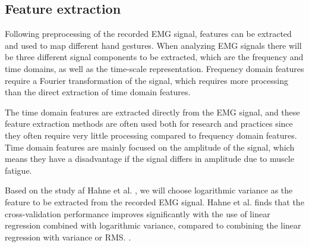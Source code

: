 \subsection{Feature extraction}



Following preprocessing of the recorded EMG signal, features can be extracted and used to map different hand gestures. When analyzing EMG signals there will be three different signal components to be extracted, which are the frequency and time domains, as well as the time-scale representation. Frequency domain features require a Fourier transformation of the signal, which requires more processing than the direct extraction of time domain features. \cite{phiny2012}

The time domain features are extracted directly from the EMG signal, and these feature extraction methods are often used both for research and practices since they often require very little processing compared to frequency domain features. Time domain features are mainly focused on the amplitude of the signal, which means they have a disadvantage if the signal differs in amplitude due to muscle fatigue. \cite{phiny2012}

Based on the study af Hahne et al. \cite{hahne2014}, we will choose logarithmic variance as the feature to be extracted from the recorded EMG signal. Hahne et al. finds that the cross-validation performance improves significantly with the use of linear regression combined with logarithmic variance, compared to combining the linear regression with variance or RMS. \cite{hahne2014}. 

